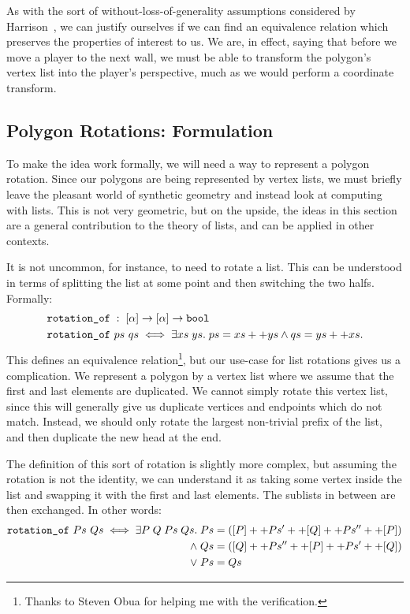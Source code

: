 As with the sort of without-loss-of-generality assumptions considered by Harrison~\cite{HarrisonWLOG}, we can justify ourselves if we can find an equivalence relation which preserves the properties of interest to us. We are, in effect, saying that before we move a player to the next wall, we must be able to transform the polygon's vertex list into the player's perspective, much as we would perform a coordinate transform.

\subsection{Polygon Rotations: Formulation}\label{sec:PolygonRotation}
To make the idea work formally, we will need a way to represent a polygon rotation. Since our polygons are being represented by vertex lists, we must briefly leave the pleasant world of synthetic geometry and instead look at computing with lists. This is not very geometric, but on the upside, the ideas in this section are a general contribution to the theory of lists, and can be applied in other contexts. 

It is not uncommon, for instance, to need to rotate a list. This can be understood in terms of splitting the list at some point and then switching the two halfs. Formally:
\begin{displaymath}
  \begin{split}
&\texttt{rotation\_of}\; :\; [\alpha] \rightarrow [\alpha] \rightarrow \texttt{bool}\\
&\texttt{rotation\_of}\ ps\ qs \iff \exists xs\;ys.\; ps = xs ++ ys \wedge qs = ys ++ xs.\\
  \end{split}
\end{displaymath}
This defines an equivalence relation\footnote{Thanks to Steven Obua for helping me with the verification.}, but our use-case for list rotations gives us a complication. We represent a polygon by a vertex list where we assume that the first and last elements are duplicated. We cannot simply rotate this vertex list, since this will generally give us duplicate vertices and endpoints which do not match. Instead, we should only rotate the largest non-trivial prefix of the list, and then duplicate the new head at the end. 

The definition of this sort of rotation is slightly more complex, but assuming the rotation is not the identity, we can understand it as taking some vertex inside the list and swapping it with the first and last elements. The sublists in between are then exchanged. In other words:
\begin{displaymath}
  \begin{aligned}
    \texttt{rotation\_of}\ Ps\ Qs \iff 
    \exists P\; Q\; Ps\; Qs.\; Ps &= ([P] ++ Ps' ++ [Q] ++ Ps'' ++ [P])\\
    \wedge\; Qs &= ([Q] ++ Ps'' ++ [P] ++ Ps' ++ [Q])\\
    \vee\; Ps &= Qs
  \end{aligned}
\end{displaymath}


